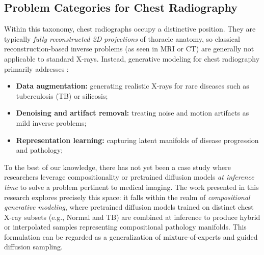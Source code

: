 \subsection{Problem Categories for Chest Radiography}

Within this taxonomy, chest radiographs occupy a distinctive position. 
They are typically \emph{fully reconstructed 2D projections} of thoracic anatomy, 
so classical reconstruction-based inverse problems (as seen in MRI or CT) are generally not applicable to standard X-rays.
Instead, generative modeling for chest radiography primarily addresses \citep{generative_ai_medical_imaging_2025}:
\begin{itemize}
    \item \textbf{Data augmentation:} generating realistic X-rays for rare diseases such as tuberculosis (TB) or silicosis;
    \item \textbf{Denoising and artifact removal:} treating noise and motion artifacts as mild inverse problems;
    \item \textbf{Representation learning:} capturing latent manifolds of disease progression and pathology;
\end{itemize}

To the best of our knowledge, there has not yet been a case study where researchers leverage compositionality or pretrained diffusion models \emph{at inference time} to solve a problem pertinent to medical imaging. 
The work presented in this research explores precisely this space: it falls within the realm of \emph{compositional generative modeling}, where pretrained diffusion models trained on distinct chest X-ray subsets (e.g., Normal and TB) are combined at inference to produce hybrid or interpolated samples representing compositional pathology manifolds. 
This formulation can be regarded as a generalization of mixture-of-experts and guided diffusion sampling.
